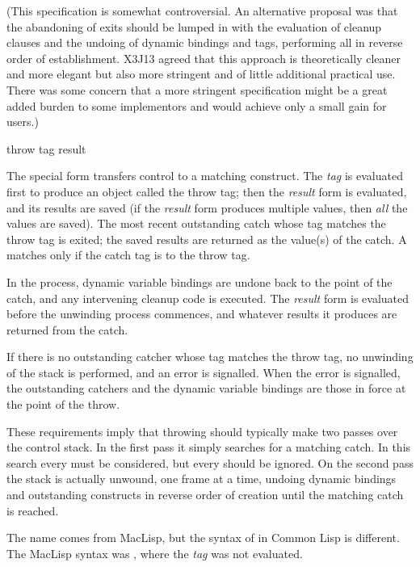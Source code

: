 \begin{defspec}
\begin{newer}
(This specification is somewhat controversial.  An alternative proposal was
that the abandoning of exits should be lumped in with
the evaluation of  cleanup clauses and the
undoing of dynamic bindings and  tags, performing all
in reverse order of establishment.  X3J13 agreed that this approach is
theoretically cleaner and more elegant but also more stringent
and of little additional practical use.  There was some concern that
a more stringent specification might be a great added burden to some
implementors and would achieve only a small gain for users.)
\end{newer}
\end{defspec}

\begin{defspec}
throw tag result

The  special form transfers control to a matching
 construct.
The {\it tag} is evaluated first to produce an object
called the throw tag; then the {\it result} form is evaluated,
and its results are saved (if the {\it result} form produces
multiple values, then {\it all} the values are saved).
The most recent outstanding catch whose tag matches the throw tag
is exited; the saved results are returned as the value(s) of the catch.
A  matches only if the catch tag is  to the throw tag.

In the process, dynamic variable
bindings are undone back to the point of the catch, and any intervening
 cleanup code is executed.
The {\it result} form is evaluated before the unwinding process commences,
and whatever results it produces are returned from the catch.

If there is no outstanding catcher whose tag matches the throw tag,
no unwinding of the stack is performed, and an error is signalled.
When the error is signalled, the outstanding catchers and the dynamic
variable bindings are those in force at the point of the throw.

\beforenoterule
\begin{implementation}
These requirements imply that throwing should typically
make two passes over the control stack.  In the first pass it simply
searches for a matching catch.  In this search every 
must be considered, but every
 should be ignored.  On the second pass the stack
is actually unwound, one frame at a time, undoing dynamic bindings
and outstanding  constructs in reverse order of creation
until the matching catch is reached.
\end{implementation}
\betweennoterule
\begin{incompatibility}
The name  comes from MacLisp,
but the syntax of  in Common Lisp is different.
The MacLisp syntax was ,
where the {\it tag} was not evaluated.
\end{incompatibility}
\afternoterule
\end{defspec}
